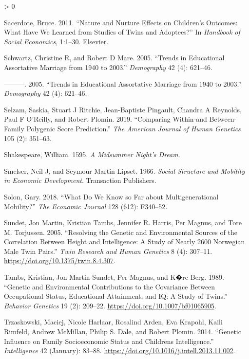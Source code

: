 \documentclass[
]{article}
\newlength{\cslhangindent}
\newenvironment{CSLReferences}[2] %
 {%
  \setlength{\parindent}{0pt}
  \ifodd #1 \everypar{\setlength{\hangindent}{\cslhangindent}}\ignorespaces\fi
  \ifnum #2 > 0
  \setlength{\parskip}{#2\baselineskip}
  \fi
 }%
 {}
\begin{document}
\begin{CSLReferences}{1}{0}
\leavevmode\hypertarget{ref-sacerdote2011nature}{}%
Sacerdote, Bruce. 2011. {``Nature and Nurture Effects on Children's Outcomes: What Have We Learned from Studies of Twins and Adoptees?''} In \emph{Handbook of Social Economics}, 1:1--30. Elsevier.

\leavevmode\hypertarget{ref-schwartz2005trends}{}%
Schwartz, Christine R, and Robert D Mare. 2005. {``Trends in Educational Assortative Marriage from 1940 to 2003.''} \emph{Demography} 42 (4): 621--46.

\leavevmode\hypertarget{ref-schwartz2005trends}{}%
---------. 2005. {``Trends in Educational Assortative Marriage from 1940 to 2003.''} \emph{Demography} 42 (4): 621--46.

\leavevmode\hypertarget{ref-selzam2019comparing}{}%
Selzam, Saskia, Stuart J Ritchie, Jean-Baptiste Pingault, Chandra A Reynolds, Paul F O'Reilly, and Robert Plomin. 2019. {``Comparing Within-and Between-Family Polygenic Score Prediction.''} \emph{The American Journal of Human Genetics} 105 (2): 351--63.

\leavevmode\hypertarget{ref-shakespeare1595midsummer}{}%
Shakespeare, William. 1595. \emph{A Midsummer Night's Dream}.

\leavevmode\hypertarget{ref-smelser1966social}{}%
Smelser, Neil J, and Seymour Martin Lipset. 1966. \emph{Social Structure and Mobility in Economic Development}. Transaction Publishers.

\leavevmode\hypertarget{ref-solon2018we}{}%
Solon, Gary. 2018. {``What Do We Know so Far about Multigenerational Mobility?''} \emph{The Economic Journal} 128 (612): F340--52.

\leavevmode\hypertarget{ref-Sundet_2005}{}%
Sundet, Jon Martin, Kristian Tambs, Jennifer R. Harris, Per Magnus, and Tore M. Torjussen. 2005. {``Resolving the Genetic and Environmental Sources of the Correlation Between Height and Intelligence: A Study of Nearly 2600 Norwegian Male Twin Pairs.''} \emph{Twin Research and Human Genetics} 8 (4): 307--11. \url{https://doi.org/10.1375/twin.8.4.307}.

\leavevmode\hypertarget{ref-Tambs_1989}{}%
Tambs, Kristian, Jon Martin Sundet, Per Magnus, and K�re Berg. 1989. {``Genetic and Environmental Contributions to the Covariance Between Occupational Status, Educational Attainment, and {IQ}: A Study of Twins.''} \emph{Behavior Genetics} 19 (2): 209--22. \url{https://doi.org/10.1007/bf01065905}.

\leavevmode\hypertarget{ref-Trzaskowski_2014}{}%
Trzaskowski, Maciej, Nicole Harlaar, Rosalind Arden, Eva Krapohl, Kaili Rimfeld, Andrew McMillan, Philip S. Dale, and Robert Plomin. 2014. {``Genetic Influence on Family Socioeconomic Status and Children{{}}s Intelligence.''} \emph{Intelligence} 42 (January): 83--88. \url{https://doi.org/10.1016/j.intell.2013.11.002}.


\end{CSLReferences}
\end{document}
